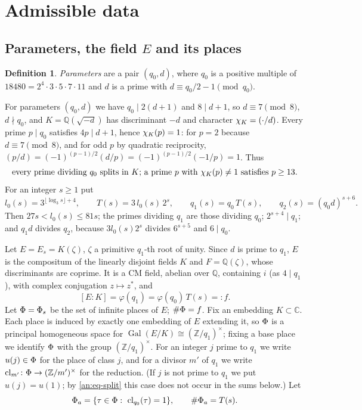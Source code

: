 \documentclass[10pt]{amsart}
\theoremstyle{definition}
\newtheorem{definition}[theorem]{Definition}
\theoremstyle{remark}
\begin{document}
\section{Admissible data}\label{an:sec-data}
\subsection{Parameters, the field \texorpdfstring{$E$}{E} and its places}\label{an:ssec-param}
\begin{definition}\label{an:def-param}
\emph{Parameters} are a pair $(q_0,d)$, where $q_0$ is a positive multiple of
$18480=2^4\cdot3\cdot5\cdot7\cdot11$ and $d$ is a prime with
$d\equiv q_0/2-1\pmod{q_0}$.
\end{definition}
For parameters $(q_0,d)$ we have $q_0\mid2(d+1)$ and $8\mid d+1$, so
$d\equiv7\pmod8$, $d\nmid q_0$, and $K=\mathbb Q(\sqrt{-d})$ has discriminant
$-d$ and character $\chi_K=(\cdot/d)$. Every prime $p\mid q_0$ satisfies
$4p\mid d+1$, hence $\chi_K(p)=1$: for $p=2$ because $d\equiv7\pmod 8$, and
for odd $p$ by quadratic reciprocity,
$(p/d)=(-1)^{(p-1)/2}(d/p)=(-1)^{(p-1)/2}(-1/p)=1$. Thus
\begin{equation}\label{an:eq-split}
 \text{every prime dividing $q_0$ splits in $K$; a prime $p$ with $\chi_K(p)\ne1$ satisfies $p\ge13$.}
\end{equation}
For an integer $s\ge1$ put
\[
 l_0(s)=3^{\lfloor\log_3s\rfloor+4},\qquad T(s)=3\,l_0(s)\,2^{s},\qquad q_1(s)=q_0\,T(s),\qquad q_2(s)=(q_0d)^{s+6}.
\]
Then $27s<l_0(s)\le81s$; the primes dividing $q_1$ are those dividing $q_0$;
$2^{s+4}\mid q_1$; and $q_1d$ divides $q_2$, because $3l_0(s)2^{s}$ divides
$6^{s+5}$ and $6\mid q_0$.

Let $E=E_s=K(\zeta)$, $\zeta$ a primitive $q_1$-th root of unity. Since $d$
is prime to $q_1$, $E$ is the compositum of the linearly disjoint fields $K$
and $F=\mathbb Q(\zeta)$, whose discriminants are coprime. It is a CM field,
abelian over $\mathbb Q$, containing $i$ (as $4\mid q_1$), with complex
conjugation $z\mapsto z^{*}$, and
\[
 [E:K]=\varphi(q_1)=\varphi(q_0)\,T(s)=:f .
\]
Let $\Phi=\Phi_s$ be the set of infinite places of $E$; $\#\Phi=f$. Fix an
embedding $K\subset\mathbb C$. Each place is induced by exactly one embedding
of $E$ extending it, so $\Phi$ is a principal homogeneous space for
$\operatorname{Gal}(E/K)\cong(\mathbb Z/q_1)^{\times}$; fixing a base place we
identify $\Phi$ with the group $(\mathbb Z/q_1)^{\times}$. For an integer $j$
prime to $q_1$ we write $u(j)\in\Phi$ for the place of class $j$, and for a
divisor $m'$ of $q_1$ we write
$\mathrm{cl}_{m'}\colon\Phi\to(\mathbb Z/m')^{\times}$ for the reduction. (If $j$ is
not prime to $q_1$ we put $u(j)=u(1)$; by \eqref{an:eq-split} this case does
not occur in the sums below.) Let
\[
 \anPa=\{\tau\in\anPl:\ \ancl_{q_0}(\tau)=1\},\qquad\#\anPa=T(s).
\]
\end{document}
